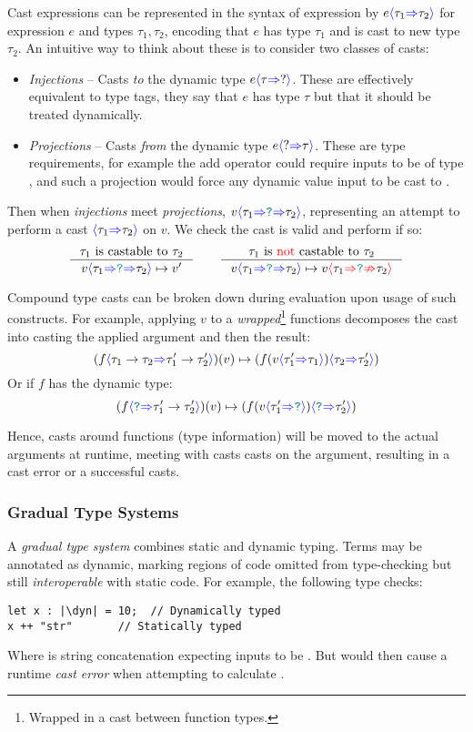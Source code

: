 Cast expressions can be represented in the syntax of expression by $e{\color{blue}\langle} \tau_1 {\color{blue}\Rightarrow} \tau_2 {\color{blue}\rangle}$ for expression $e$ and types $\tau_1, \tau_2$, encoding that $e$ has type $\tau_1$ and is cast to new type $\tau_2$. An intuitive way to think about these is to consider two classes of casts:
\begin{itemize}
\item \textit{Injections} -- Casts \textit{to} the dynamic type $e{\color{blue}\langle} \tau {\color{blue}\Rightarrow} ? {\color{blue}\rangle}$. These are effectively equivalent to type tags, they say that $e$ has type $\tau$ but that it should be treated dynamically.
\item \textit{Projections} -- Casts \textit{from} the dynamic type $e{\color{blue}\langle} ? {\color{blue}\Rightarrow} \tau {\color{blue}\rangle}$. These are type requirements, for example the add operator could require inputs to be of type , and such a projection would force any dynamic value input to be cast to . 
\end{itemize}
Then when \textit{injections} meet \textit{projections}, $v{\color{blue}\langle} \tau_1 {\color{blue}\Rightarrow} {\color{teal}\texttt{?}} {\color{blue}\Rightarrow} \tau_2 {\color{blue}\rangle}$, representing an attempt to perform a cast ${\color{blue}\langle} \tau_1 {\color{blue}\Rightarrow} \tau_2 {\color{blue}\rangle}$ on $v$. We check the cast is valid and perform if so:
\[\inference{\tau_1 \text{ is castable to } \tau_2}{v\scastcast{\tau_1}{\dyn}{\tau_2} \mapsto v'} \qquad \inference{\tau_1  \text{ is {\color{red} not }castable to }  \tau_2}{v\scastcast{\tau_1}{\dyn}{\tau_2} \mapsto v\scasterror{\tau_1}{\tau_2}}\]


Compound type casts can be broken down during evaluation upon usage of such constructs. For example, applying $v$ to a \textit{wrapped}\footnote{Wrapped in a cast between function types.} functions decomposes the cast into casting the applied argument and then the result:
\[(f{\color{blue}\langle} \tau_1 \to \tau_2 {\color{blue}\Rightarrow} \tau_1' \to \tau_2' {\color{blue}\rangle})(v) \mapsto (f(v {\color{blue}\langle} \tau_1' {\color{blue}\Rightarrow} \tau_1 {\color{blue}\rangle}){\color{blue}\langle} \tau_2 {\color{blue}\Rightarrow} \tau_2' {\color{blue}\rangle})\]
Or if $f$ has the dynamic type:
\[(f{\color{blue}\langle} {\color{teal}\texttt{?}} {\color{blue}\Rightarrow} \tau_1' \to \tau_2' {\color{blue}\rangle})(v) \mapsto (f(v {\color{blue}\langle} \tau_1' {\color{blue}\Rightarrow} {\color{teal}\texttt{?}} {\color{blue}\rangle}){\color{blue}\langle} {\color{teal}\texttt{?}} {\color{blue}\Rightarrow} \tau_2' {\color{blue}\rangle})\]

Hence, casts around functions (type information) will be moved to the actual arguments at runtime, meeting with casts casts on the argument, resulting in a cast error or a successful casts.

\subsubsection{Gradual Type Systems}\label{sec:GradualTypeSystem}

A \textit{gradual type system} \cite{GradualRefined, GradualFunctional} combines static and dynamic typing. Terms may be annotated as dynamic, marking regions of code omitted from type-checking but still \textit{interoperable} with static code. For example, the following type checks:
\begin{verbatim}
let x : |\dyn| = 10;  // Dynamically typed
x ++ "str"       // Statically typed
\end{verbatim}
Where \code{++} is string concatenation expecting inputs to be . But would then cause a runtime \textit{cast error} when attempting to calculate .

